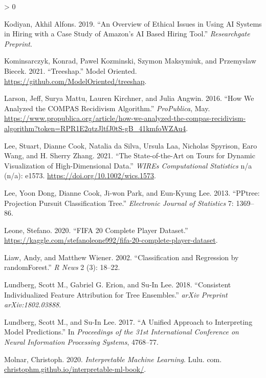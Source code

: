 \documentclass[
]{article}
\newlength{\cslhangindent}
\newenvironment{CSLReferences}[2] %
 {%
  \setlength{\parindent}{0pt}
  \ifodd #1 \everypar{\setlength{\hangindent}{\cslhangindent}}\ignorespaces\fi
  \ifnum #2 > 0
  \setlength{\parskip}{#2\baselineskip}
  \fi
 }%
 {}
\begin{document}
\begin{CSLReferences}{1}{0}
\leavevmode\hypertarget{ref-kodiyan_overview_2019}{}%
Kodiyan, Akhil Alfons. 2019. {``An Overview of Ethical Issues in Using
{AI} Systems in Hiring with a Case Study of {Amazon}'s {AI} Based Hiring
Tool.''} \emph{Researchgate Preprint}.

\leavevmode\hypertarget{ref-kominsarczyk_treeshap_2021}{}%
Kominsarczyk, Konrad, Pawel Kozminski, Szymon Maksymiuk, and Przemyslaw
Biecek. 2021. {``Treeshap.''} Model Oriented.
\url{https://github.com/ModelOriented/treeshap}.

\leavevmode\hypertarget{ref-larson_how_2016}{}%
Larson, Jeff, Surya Mattu, Lauren Kirchner, and Julia Angwin. 2016.
{``How {We} {Analyzed} the {COMPAS} {Recidivism} {Algorithm}.''}
\emph{ProPublica}, May.
\url{https://www.propublica.org/article/how-we-analyzed-the-compas-recidivism-algorithm?token=RPR1E2qtzJltfJ0tS-gB_41kmfoWZAu4}.

\leavevmode\hypertarget{ref-lee_state_2021}{}%
Lee, Stuart, Dianne Cook, Natalia da Silva, Ursula Laa, Nicholas
Spyrison, Earo Wang, and H. Sherry Zhang. 2021. {``The State-of-the-Art
on Tours for Dynamic Visualization of High-Dimensional Data.''}
\emph{WIREs Computational Statistics} n/a (n/a): e1573.
\url{https://doi.org/10.1002/wics.1573}.

\leavevmode\hypertarget{ref-lee_pptree_2013}{}%
Lee, Yoon Dong, Dianne Cook, Ji-won Park, and Eun-Kyung Lee. 2013.
{``{PPtree}: {Projection} Pursuit Classification Tree.''}
\emph{Electronic Journal of Statistics} 7: 1369--86.

\leavevmode\hypertarget{ref-leone_fifa_2020}{}%
Leone, Stefano. 2020. {``{FIFA} 20 Complete Player Dataset.''}
\url{https://kaggle.com/stefanoleone992/fifa-20-complete-player-dataset}.

\leavevmode\hypertarget{ref-liaw_classification_2002}{}%
Liaw, Andy, and Matthew Wiener. 2002. {``Classification and Regression
by {randomForest}.''} \emph{R News} 2 (3): 18--22.

\leavevmode\hypertarget{ref-lundberg_consistent_2018}{}%
Lundberg, Scott M., Gabriel G. Erion, and Su-In Lee. 2018. {``Consistent
Individualized Feature Attribution for Tree Ensembles.''} \emph{arXiv
Preprint arXiv:1802.03888}.

\leavevmode\hypertarget{ref-lundberg_unified_2017}{}%
Lundberg, Scott M., and Su-In Lee. 2017. {``A Unified Approach to
Interpreting Model Predictions.''} In \emph{Proceedings of the 31st
International Conference on Neural Information Processing Systems},
4768--77.

\leavevmode\hypertarget{ref-molnar_interpretable_2020}{}%
Molnar, Christoph. 2020. \emph{Interpretable Machine Learning}. Lulu.
com.
\href{https://christophm.github.io/interpretable-ml-book/}{christophm.github.io/interpretable-ml-book/}.


\end{CSLReferences}
\end{document}
